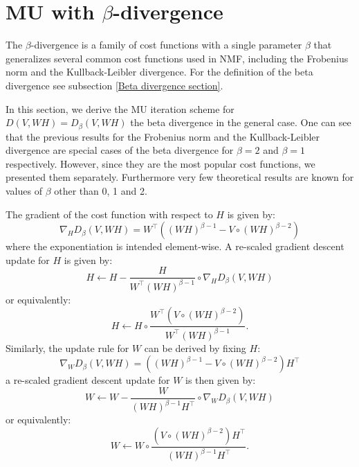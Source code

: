 \section{MU with \texorpdfstring{$\beta$-divergence}{beta-divergence}} \label{MU beta section}
The $\beta$-divergence is a family of cost functions with a single parameter $\beta$ that generalizes several common cost functions used in NMF, including the Frobenius norm and the Kullback-Leibler divergence.
For the definition of the beta divergence see subsection \ref{Beta divergence section}.
\par
In this section, we derive the MU iteration scheme for $D(V, WH) = D_{\beta}(V, WH)$ the beta divergence in the general case.
One can see that the previous results for the Frobenius norm and the Kullback-Leibler divergence are special cases of the beta divergence for $\beta = 2$ and $\beta = 1$ respectively.
However, since they are the most popular cost functions, we presented them separately.
Furthermore very few theoretical results are known for values of $\beta$ other than 0, 1 and 2.
\par
The gradient of the cost function with respect to \( H \) is given by:
\begin{equation}
    \nabla_H D_{\beta}(V, WH) = W^\top \left( (WH)^{\beta - 1} - V \circ (WH)^{\beta - 2} \right)
\end{equation}
where the exponentiation is intended element-wise.
A re-scaled gradient descent update for \( H \) is given by:
\begin{equation}
    H \leftarrow H - \frac{H}{W^\top (WH)^{\beta - 1}} \circ \nabla_H D_{\beta}(V, WH)
\end{equation}
or equivalently:
\begin{equation}
    H \leftarrow H \circ \frac{W^\top (V \circ (WH)^{\beta - 2})}{W^\top (WH)^{\beta - 1}}.
\end{equation}
Similarly, the update rule for \( W \) can be derived by fixing \( H \):
\begin{equation}
    \nabla_W D_{\beta}(V, WH) = \left( (WH)^{\beta - 1} - V \circ (WH)^{\beta - 2} \right) H^\top
\end{equation}
a re-scaled gradient descent update for \( W \) is then given by:
\begin{equation}
    W \leftarrow W - \frac{W}{(WH)^{\beta - 1} H^\top} \circ \nabla_W D_{\beta}(V, WH)
\end{equation}
or equivalently:
\begin{equation}
    W \leftarrow W \circ \frac{(V \circ (WH)^{\beta - 2}) H^\top}{(WH)^{\beta - 1} H^\top}.
\end{equation}
